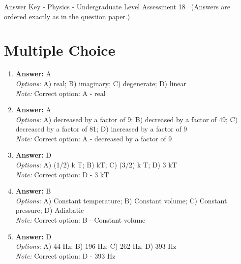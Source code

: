 \documentclass[12pt]{article}
\begin{document}
\begin{center}
Answer Key - Physics - Undergraduate Level Assessment 18 \
\small (Answers are ordered exactly as in the question paper.)
\end{center}

\section*{Multiple Choice}
\begin{enumerate}[label=\arabic*.]
\item \textbf{Answer:} A
\\ \textit{Options:} A) real; B) imaginary; C) degenerate; D) linear
\\ \textit{Note:} Correct option: A - real
\item \textbf{Answer:} A
\\ \textit{Options:} A) decreased by a factor of 9; B) decreased by a factor of 49; C) decreased by a factor of 81; D) increased by a factor of 9
\\ \textit{Note:} Correct option: A - decreased by a factor of 9
\item \textbf{Answer:} D
\\ \textit{Options:} A) (1/2) k T; B) kT; C) (3/2) k T; D) 3 kT
\\ \textit{Note:} Correct option: D - 3 kT
\item \textbf{Answer:} B
\\ \textit{Options:} A) Constant temperature; B) Constant volume; C) Constant pressure; D) Adiabatic
\\ \textit{Note:} Correct option: B - Constant volume
\item \textbf{Answer:} D
\\ \textit{Options:} A) 44 Hz; B) 196 Hz; C) 262 Hz; D) 393 Hz
\\ \textit{Note:} Correct option: D - 393 Hz
\end{enumerate}
\end{document}
